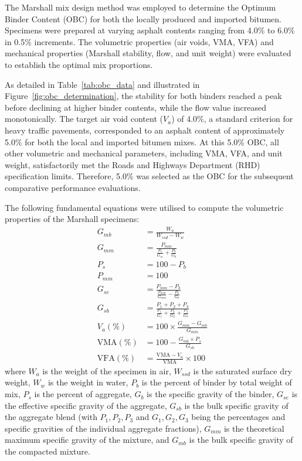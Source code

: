 \documentclass[12pt,a4paper]{article}
\begin{document}
The Marshall mix design method was employed to determine the Optimum Binder Content (OBC) for both the locally produced and imported bitumen. Specimens were prepared at varying asphalt contents ranging from 4.0\% to 6.0\% in 0.5\% increments. The volumetric properties (air voids, VMA, VFA) and mechanical properties (Marshall stability, flow, and unit weight) were evaluated to establish the optimal mix proportions. 

As detailed in Table~\ref{tab:obc_data} and illustrated in Figure~\ref{fig:obc_determination}, the stability for both binders reached a peak before declining at higher binder contents, while the flow value increased monotonically. The target air void content ($V_a$) of 4.0\%, a standard criterion for heavy traffic pavements, corresponded to an asphalt content of approximately 5.0\% for both the local and imported bitumen mixes. At this 5.0\% OBC, all other volumetric and mechanical parameters, including VMA, VFA, and unit weight, satisfactorily met the Roads and Highways Department (RHD) specification limits. Therefore, 5.0\% was selected as the OBC for the subsequent comparative performance evaluations.

The following fundamental equations were utilised to compute the volumetric properties of the Marshall specimens:
\begin{align}
    G_{mb} &= \frac{W_a}{W_{ssd} - W_w} \\
    G_{mm} &= \frac{P_{mm}}{\frac{P_s}{G_{se}} + \frac{P_b}{G_b}} \\
    P_s &= 100 - P_b \\
    P_{mm} &= 100 \\
    G_{se} &= \frac{P_{mm} - P_b}{\frac{P_{mm}}{G_{mm}} - \frac{P_b}{G_b}} \\
    G_{sb} &= \frac{P_1 + P_2 + P_3}{\frac{P_1}{G_1} + \frac{P_2}{G_2} + \frac{P_3}{G_3}} \\
    V_a (\%) &= 100 \times \frac{G_{mm} - G_{mb}}{G_{mm}} \\
    \text{VMA} (\%) &= 100 - \frac{G_{mb} \times P_s}{G_{sb}} \\
    \text{VFA} (\%) &= \frac{\text{VMA} - V_a}{\text{VMA}} \times 100
\end{align}
where $W_a$ is the weight of the specimen in air, $W_{ssd}$ is the saturated surface dry weight, $W_w$ is the weight in water, $P_b$ is the percent of binder by total weight of mix, $P_s$ is the percent of aggregate, $G_b$ is the specific gravity of the binder, $G_{se}$ is the effective specific gravity of the aggregate, $G_{sb}$ is the bulk specific gravity of the aggregate blend (with $P_1, P_2, P_3$ and $G_1, G_2, G_3$ being the percentages and specific gravities of the individual aggregate fractions), $G_{mm}$ is the theoretical maximum specific gravity of the mixture, and $G_{mb}$ is the bulk specific gravity of the compacted mixture.
\end{document}
